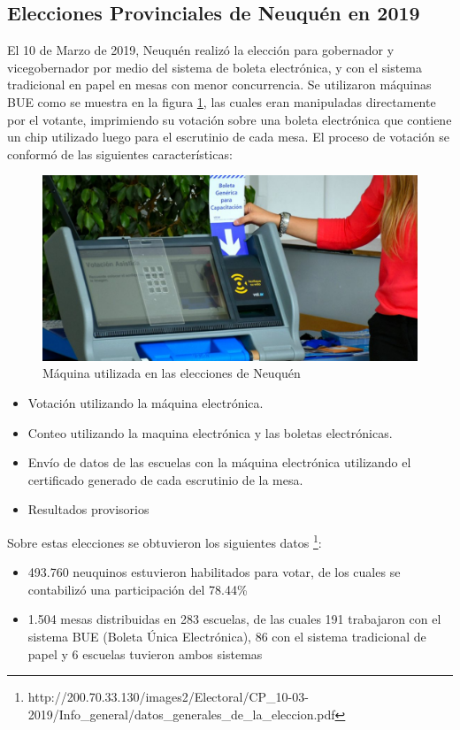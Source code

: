 \subsection{Elecciones Provinciales de Neuquén en 2019}
El 10 de Marzo de 2019, Neuquén realizó la elección para gobernador y vicegobernador por medio del sistema de boleta electrónica, y con el sistema tradicional en papel en mesas con menor concurrencia. Se utilizaron máquinas BUE como se muestra en la figura \ref{fig:maquinasBUE}, las cuales eran manipuladas directamente por el votante, imprimiendo su votación sobre una boleta electrónica que contiene un chip utilizado luego para el escrutinio de cada mesa. El proceso de votación se conformó de las siguientes características:
\begin{figure}
\begin{center}
  \includegraphics[scale=0.4]{img/Maquina_BUE.jpg}
  \caption{Máquina utilizada en las elecciones de Neuquén}
  \label{fig:maquinasBUE}
\end{center}
\end{figure}
\begin{itemize}
    \item Votación utilizando la máquina electrónica.
    \item Conteo utilizando la maquina electrónica y las boletas electrónicas.
    \item Envío de datos de las escuelas con la máquina electrónica utilizando el certificado generado de cada escrutinio de la mesa.
    \item Resultados provisorios
\end{itemize}

\newline Sobre estas elecciones se obtuvieron los siguientes datos \footnote{http://200.70.33.130/images2/Electoral/CP_10-03-2019/Info\_general/datos\_generales\_de\_la\_eleccion.pdf}:
\begin{itemize}
    \item 493.760 neuquinos estuvieron habilitados para votar, de los cuales se contabilizó una participación del 78.44\%
    \item 1.504 mesas distribuidas en 283 escuelas, de las cuales 191 trabajaron con el sistema BUE (Boleta Única Electrónica), 86 con el sistema tradicional de papel y 6 escuelas tuvieron ambos sistemas
\end{itemize}


